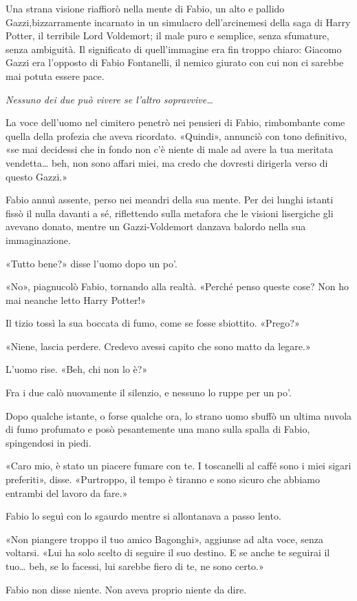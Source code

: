 Una strana visione riaffiorò nella mente di Fabio, un alto e pallido Gazzi,bizzarramente incarnato in un simulacro dell'arcinemesi della saga di Harry Potter, il terribile Lord Voldemort; il male puro e semplice, senza sfumature, senza ambiguità. Il significato di quell'immagine era fin troppo chiaro: Giacomo Gazzi era l'opposto di Fabio Fontanelli, il nemico giurato con cui non ci sarebbe mai potuta essere pace.

\emph{Nessuno dei due può vivere se l'altro sopravvive\ldots{}}

La voce dell'uomo nel cimitero penetrò nei pensieri di Fabio, rimbombante come quella della profezia che aveva ricordato. «Quindi», annunciò con tono definitivo, «se mai decidessi che in fondo non c'è niente di male ad avere la tua meritata vendetta\ldots{} beh, non sono affari miei, ma credo che dovresti dirigerla verso di questo Gazzi.»

Fabio annuì assente, perso nei meandri della sua mente. Per dei lunghi istanti fissò il nulla davanti a sé, riflettendo sulla metafora che le visioni lisergiche gli avevano donato, mentre un Gazzi-Voldemort danzava balordo nella sua immaginazione.

«Tutto bene?» disse l'uomo dopo un po'.

«No», piagnucolò Fabio, tornando alla realtà. «Perché penso queste cose? Non ho mai neanche letto Harry Potter!»

Il tizio tossì la sua boccata di fumo, come se fosse sbiottito. «Prego?»

«Niene, lascia perdere. Credevo avessi capito che sono matto da legare.»

L'uomo rise. «Beh, chi non lo è?»

Fra i due calò nuovamente il silenzio, e nessuno lo ruppe per un po'.

Dopo qualche istante, o forse qualche ora, lo strano uomo sbuffò un ultima nuvola di fumo profumato e posò pesantemente una mano sulla spalla di Fabio, spingendosi in piedi.

«Caro mio, è stato un piacere fumare con te. I toscanelli al caffé sono i miei sigari preferiti», disse. «Purtroppo, il tempo è tiranno e sono sicuro che abbiamo entrambi del lavoro da fare.»

Fabio lo seguì con lo sgaurdo mentre si allontanava a passo lento.

«Non piangere troppo il tuo amico Bagonghi», aggiunse ad alta voce, senza voltarsi. «Lui ha solo scelto di seguire il suo destino. E se anche te seguirai il tuo\ldots{} beh, se lo facessi, lui sarebbe fiero di te, ne sono certo.»

Fabio non disse niente. Non aveva proprio niente da dire.
